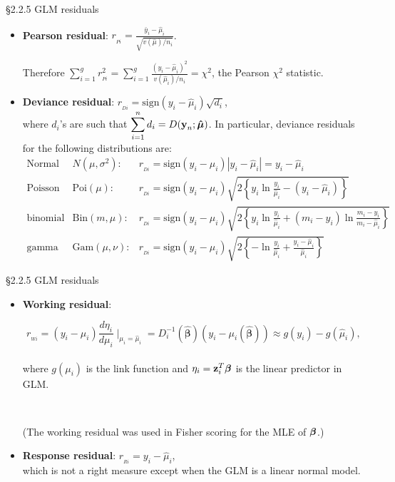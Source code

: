 \documentclass{beamer}
\newcommand{\boldbeta}{{\boldsymbol \beta}}
\begin{document}
\begin{frame}{\S2.2.5 GLM residuals}
\begin{itemize}
\item
\textbf{Pearson residual}: $r_{_{Pi}}=\frac{\bar{y}_i-\hat{\mu}_i}{\sqrt{v(\hat{\mu})/n_i}}$.

Therefore $\sum_{i=1}^g r^2_{_{Pi}}=\sum_{i=1}^g \frac{(y_i-\hat{\mu}_i)^2}{v(\hat{\mu}_i)/n_i}=\chi^2$, the
Pearson $\chi^2$ statistic. 
\item
\textbf{Deviance residual}: $r_{_{Di}}=\mbox{sign}(y_i-\hat{\mu}_i)\sqrt{d_i}$, \\ where $d_i$'s are such that
$\displaystyle \sum_{i=1}^n d_i=D(\textbf{y}_n;\mbox{\boldmath $\hat{\mu}$})$. In particular, deviance residuals for
the following distributions are:
{\footnotesize
\begin{eqnarray*}
\mbox{Normal}\!\!\! & N(\mu,\sigma^2): & r_{_{Di}}\!=\!\mbox{sign}(y_i-\hat{\mu}_i)
|y_i-\hat{\mu}_i|\!=\!y_i-\hat{\mu}_i \\
\mbox{Poisson}\!\!\! &\mbox{Poi}(\mu): &  r_{_{Di}}\!=\!\mbox{sign}(y_i-\hat{\mu}_i)\sqrt{2\left\{y_i
\ln\frac{y_i}{\hat{\mu}_i}-(y_i-\hat{\mu}_i)\right\}} \\
\mbox{binomial}\!\!\! & \mbox{Bin}(m,\mu): & r_{_{Di}}\!=\!\mbox{sign}(y_i-\hat{\mu}_i)\sqrt{2
\left\{y_i\ln\frac{y_i}{\hat{\mu}_i}\!+\!(\!m_i\!-\!y_i\!)\ln\frac{m_i\!-\!y_i}{m_i\!-\!\hat{\mu}_i}\right\}} \\
\mbox{gamma} \!\!\!& \mbox{Gam}(\mu,\nu): & r_{_{Di}}\!=\!\mbox{sign}(y_i-\hat{\mu}_i)\sqrt{2
\left\{-\ln\frac{y_i}{\hat{\mu}_i}+\frac{y_i-\hat{\mu}_i}{\hat{\mu}_i}\right\}}
\end{eqnarray*}}
\end{itemize}
\end{frame}

\begin{frame}{\S2.2.5 GLM residuals}
\begin{itemize}
\item
\textbf{Working residual}: 

\[r_{_{Wi}}=(y_i- \mu_i)\frac{d\eta_i}{d\mu_i}\mid_{\mu_i=\hat{\mu}_i} = 
D_i^{-1} (\hat{\boldbeta}) (y_i- \mu_i (\hat{\boldbeta}))
 \approx g(y_i)-g(\hat{\mu}_i),
\] \\
where $g(\mu_i)$ is the link function and $\eta_i=\textbf{z}_i^T\mbox{\boldmath $\beta$}$ is the linear predictor in GLM.

\ \

(The working residual was used in Fisher scoring for the MLE of $\mbox{\boldmath $\beta$}$.)
\item
\textbf{Response residual}: $r_{_{Ri}}=y_i-\hat{\mu}_i$, \\
which is not a right measure except when the GLM is a linear normal model.
\end{itemize}
\end{frame}
\end{document}

